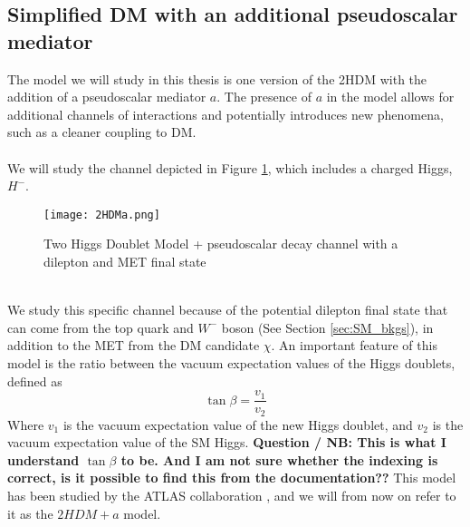 \documentclass[12pt, a4paper]{book}
\begin{document}
\subsection{Simplified DM with an additional pseudoscalar mediator}
The model we will study in this thesis is one version of the 2HDM with the addition of a pseudoscalar mediator $a$. The presence of $a$ in the model allows for additional channels of interactions and potentially introduces new phenomena, such as a cleaner coupling to DM. \\
\\We will study the channel depicted in Figure \ref{fig:2HDMa}, which includes a charged Higgs, $H^-$.  
\begin{figure}[!ht]
    \centering
    \texttt{[image: 2HDMa.png]}
    \caption[2HDM + a model]{Two Higgs Doublet Model + pseudoscalar decay channel with a dilepton and MET final state}\label{fig:2HDMa}
\end{figure}
\\ We study this specific channel because of the potential dilepton final state that can come from the top quark and $W^-$ boson (See Section \ref{sec:SM_bkgs}), in addition to the MET from the DM candidate $\chi$. An important feature of this model 
is the ratio between the vacuum expectation values of the Higgs doublets, defined as
\begin{equation}\label{eq:vev}
    \tan\beta = \frac{v_1}{v_2}
\end{equation}
Where $v_1$ is the vacuum expectation value of the new Higgs doublet, and $v_2$ is the vacuum expectation value of the SM Higgs. \textbf{Question / NB: This is what I understand $\tan\beta$ to be. And I am not sure whether the indexing is correct, is it possible to find this from the documentation?? }
 This model has been studied by the ATLAS collaboration \cite{ATLAS-CONF-2021-036}, and we will from now on refer to it as the $2HDM + a$ model.
\end{document}
